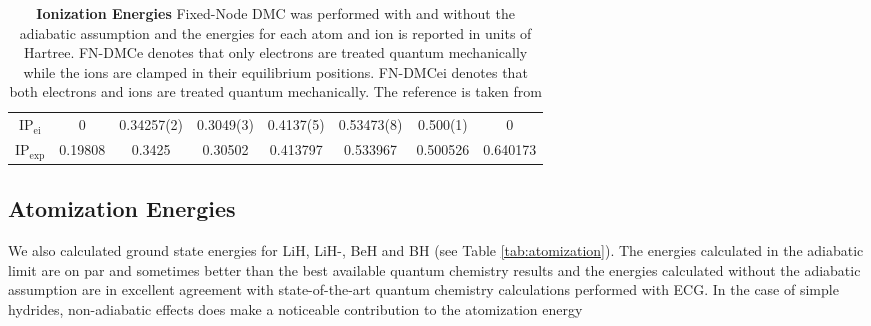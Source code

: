 \documentclass[aps,prl,superscriptaddress,groupedaddress]{revtex4}
\begin{document}
\begin{table*}[htp!]
\begin{tabular}{*{1}{*{8}{c}}}
$\text{IP}_{\text{ei}}$ & 0 & 0.34257(2) & 0.3049(3) & 0.4137(5) & 0.53473(8) & 0.500(1) & 0 \\
$\text{IP}_{\text{exp}}$ & 0.19808 & 0.3425 & 0.30502 & 0.413797 & 0.533967 & 0.500526 & 0.640173 \\
\hline
\end{tabular}
\caption{\textbf{Ionization Energies} Fixed-Node DMC was performed with and without the adiabatic assumption and the energies for each atom and ion is reported in units of Hartree. FN-DMCe denotes that only electrons are treated quantum mechanically while the ions are clamped in their equilibrium positions. FN-DMCei denotes that both electrons and ions are treated quantum mechanically. The reference is taken from \cite{Seth_Bench} \label{tab:ionization}}
\end{table*}
\subsection{Atomization Energies}
We also calculated ground state energies for LiH, LiH-, BeH and BH (see Table \ref{tab:atomization}). The energies calculated in the adiabatic limit are on par and sometimes better than the best available quantum chemistry results \cite{Adamowicz_LiH,Koput_BeH,Miliordos_BH} and the energies calculated without the adiabatic assumption are in excellent agreement with state-of-the-art quantum chemistry calculations performed with ECG. In the case of simple hydrides, non-adiabatic effects does make a noticeable contribution to the atomization energy 
\end{document}
